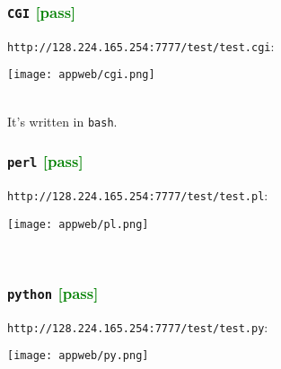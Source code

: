\documentclass[a4paper]{report}
\begin{document}
\subsubsection{{\tt CGI} \textcolor{green}{[pass]}}
{\tt http://128.224.165.254:7777/test/test.cgi}:
\\[\intextsep]
\begin{minipage}{\textwidth}
\centering
\texttt{[image: appweb/cgi.png]}
\end{minipage}
\\[\intextsep]
It's written in {\tt bash}.
\subsubsection{{\tt perl} \textcolor{green}{[pass]}}
{\tt http://128.224.165.254:7777/test/test.pl}:
\\[\intextsep]
\begin{minipage}{\textwidth}
\centering
\texttt{[image: appweb/pl.png]}
\end{minipage}
\\[\intextsep]
\subsubsection{{\tt python} \textcolor{green}{[pass]}}
{\tt http://128.224.165.254:7777/test/test.py}:
\\[\intextsep]
\begin{minipage}{\textwidth}
\centering
\texttt{[image: appweb/py.png]}
\end{minipage}
\\[\intextsep]
\end{document}
